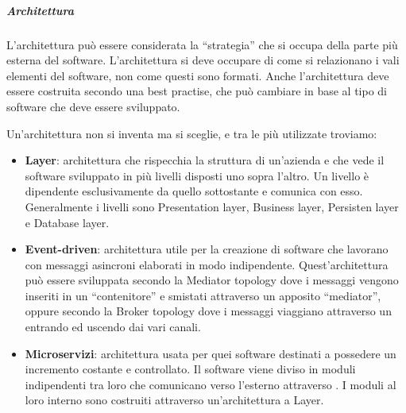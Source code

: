         \subparagraph{Architettura} \label{PP:progettazione:architettura}
        L'architettura può essere considerata la ``strategia'' che si occupa della parte più esterna del software. L'architettura si deve occupare di come si relazionano i vali elementi del software, non come questi sono formati. Anche l'architettura deve essere costruita secondo una best practise, che può cambiare in base al tipo di software che deve essere sviluppato. \par
        Un'architettura non si inventa ma si sceglie, e tra le più utilizzate troviamo:
        \begin{itemize}
            \item \textbf{Layer}: architettura che rispecchia la struttura di un'azienda e che vede il software sviluppato in più livelli disposti uno sopra l'altro. Un livello è dipendente esclusivamente da quello sottostante e comunica con esso. Generalmente i livelli sono Presentation layer, Business layer, Persisten layer e Database layer.
            \item \textbf{Event-driven}: architettura utile per la creazione di software che lavorano con messaggi asincroni elaborati in modo indipendente. Quest'architettura può essere sviluppata secondo la Mediator topology dove i messaggi vengono inseriti in un ``contenitore'' e smistati attraverso un apposito ``mediator'', oppure secondo la Broker topology dove i messaggi viaggiano attraverso un  entrando ed uscendo dai vari canali.
            \item \textbf{Microservizi}: architettura usata per quei software destinati a possedere un incremento costante e controllato. Il software viene diviso in moduli indipendenti tra loro che comunicano verso l'esterno attraverso . I moduli al loro interno sono costruiti attraverso un'architettura a Layer.
        \end{itemize}

